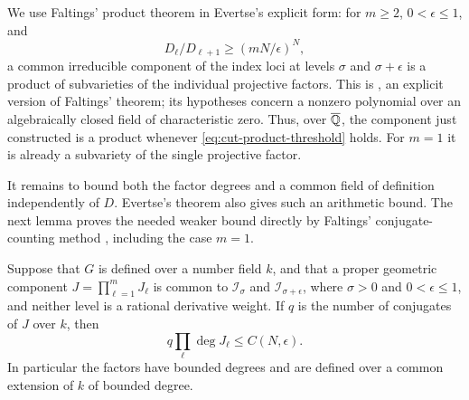 We use Faltings' product theorem \cite[Theorem~3.1]{Faltings1991}
in Evertse's explicit form:
for $m\ge2$, $0<\epsilon\le1$, and
\begin{equation}\label{eq:cut-product-threshold}
 D_\ell/D_{\ell+1}\ge(mN/\epsilon)^N,
\end{equation}
a common irreducible component of the index loci at levels
$\sigma$ and $\sigma+\epsilon$ is a product of subvarieties of the
individual projective factors.  This is
\cite[Theorem~1]{Evertse1995Product}, an explicit version of
Faltings' theorem; its hypotheses concern a nonzero polynomial over
an algebraically closed field of characteristic zero.  Thus, over
$\overline{\mathbb Q}$, the component just constructed is a product whenever
\eqref{eq:cut-product-threshold} holds.  For $m=1$ it is already a
subvariety of the single projective factor.

It remains to bound both the factor degrees and a common field of
definition independently of $D$.  Evertse's theorem also gives such
an arithmetic bound.  The next lemma proves the needed weaker bound
directly by Faltings' conjugate-counting method
\cite[Remark~3.2]{Faltings1991}, including the case $m=1$.

\begin{lemma}\label{lemma:conjugate-product-degree}
Suppose that $G$ is defined over a number field $k$, and that a
proper geometric component
$J=\prod_{\ell=1}^mJ_\ell$ is common to
$\mathcal I_\sigma$ and $\mathcal I_{\sigma+\epsilon}$, where
$\sigma>0$ and $0<\epsilon\le1$, and neither level is a rational
derivative weight.  If $q$ is the number of conjugates of $J$ over
$k$, then
\begin{equation}\label{eq:conjugate-product-degree}
 q\prod_\ell\deg J_\ell\le C(N,\epsilon).
\end{equation}
In particular the factors have bounded degrees and are defined over
a common extension of $k$ of bounded degree.
\end{lemma}

